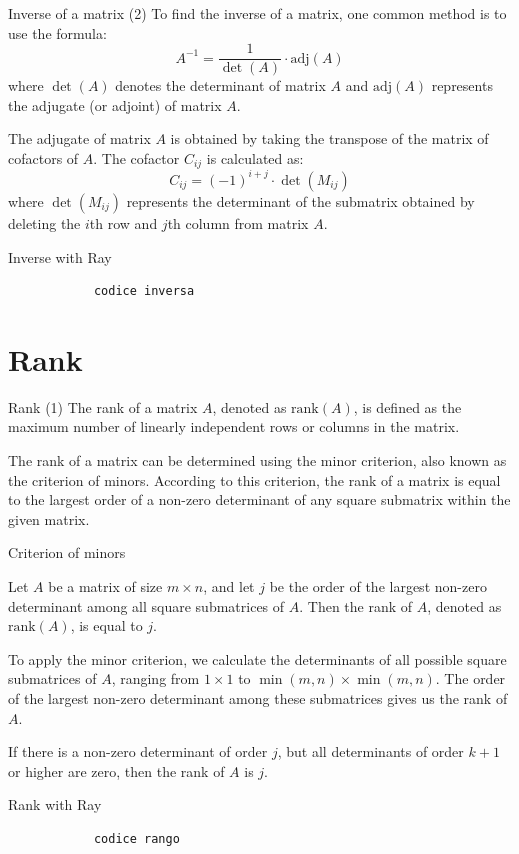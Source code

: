 \documentclass{beamer}
\begin{document}
\begin{frame}{Inverse of a matrix (2)}
    To find the inverse of a matrix, one common method is to use the formula:
    $$
        A^{-1} = \frac{1}{\det(A)} \cdot \text{adj}(A)
    $$
    where $\det(A)$ denotes the determinant of matrix $A$ and $\text{adj}(A)$ represents the adjugate (or adjoint) of matrix $A$.

    The adjugate of matrix $A$ is obtained by taking the transpose of the matrix of cofactors of $A$. The cofactor $C_{ij}$ is calculated as:
    $$
        C_{ij} = (-1)^{i+j} \cdot \det(M_{ij})
    $$
    where $\det(M_{ij})$ represents the determinant of the submatrix obtained by deleting the $i$th row and $j$th column from matrix $A$.
\end{frame}

\begin{frame}[fragile]{Inverse with Ray}
    \begin{small}
        \begin{verbatim}
            codice inversa
        \end{verbatim}
    \end{small}
\end{frame}

\section{Rank}
\begin{frame}{Rank (1)}
    The \alert{rank} of a matrix $A$, denoted as $\text{rank}(A)$, is defined as the maximum number of linearly independent rows or columns in the matrix.

    The rank of a matrix can be determined using the minor criterion, also known as the \alert{criterion of minors}. According to this criterion, the rank of a matrix is equal to the largest order of a non-zero determinant of any square submatrix within the given matrix.
\end{frame}

\begin{frame}{Criterion of minors}

Let $A$ be a matrix of size $m \times n$, and let $j$ be the order of the largest non-zero determinant among all square submatrices of $A$. Then the rank of $A$, denoted as $\text{rank}(A)$, is equal to $j$.

To apply the minor criterion, we calculate the determinants of all possible square submatrices of $A$, ranging from $1 \times 1$ to $\min(m,n) \times \min(m,n)$. The order of the largest non-zero determinant among these submatrices gives us the rank of $A$.

If there is a non-zero determinant of order $j$, but all determinants of order $k+1$ or higher are zero, then the rank of $A$ is $j$.
\end{frame}

\begin{frame}[fragile]{Rank with Ray}
    \begin{small}
        \begin{verbatim}
            codice rango
        \end{verbatim}
    \end{small}
\end{frame}
\end{document}
